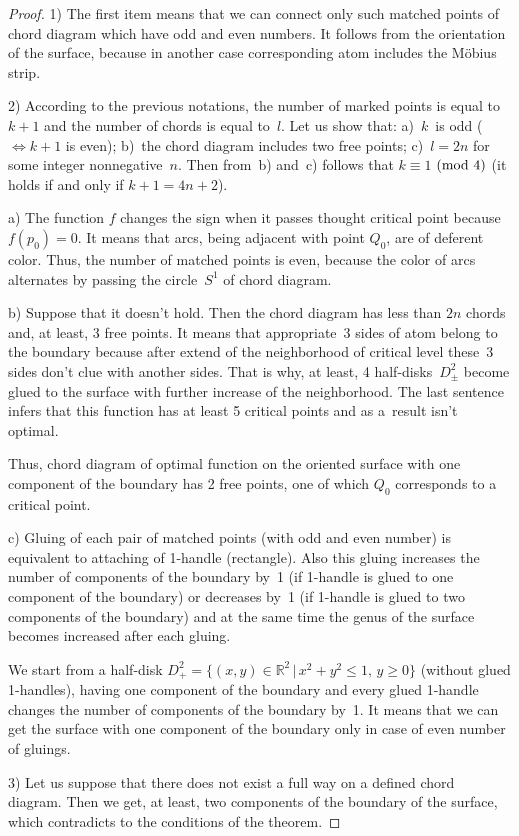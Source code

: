 \documentclass[pdftex]{sigma}
\numberwithin{equation}{section}
\begin{document}
\begin{proof}
1) The f\/irst item means that we can connect only such matched points of chord diagram which have odd and even numbers. It follows from the orientation of the surface, because in another case corresponding atom includes the M\"{o}bius strip.

2) According to the previous notations, the number of marked points is equal to $k+1$ and the number of chords is equal to~$l$. Let us show that: a)~$k$~is odd ($\Leftrightarrow k+1$ is even); b)~the chord diagram includes two free points; c)~$l=2n$ for some integer nonnegative~$n$. Then from~b) and~c) follows that $k\equiv1$ $({\rm mod}~4)$ (it holds if and only if $k+1=4n+2$).

a) The function $f$ changes the sign when it passes thought critical point because $f(p_{0})=0$. It means that arcs, being adjacent with point $Q_0$, are of deferent color. Thus, the number of matched points is even, because the color of arcs alternates by passing the circle~$S^1$ of chord diagram.

b) Suppose that it doesn't hold. Then the chord diagram has less than $2n$ chords and, at least, 3 free points. It means that appropriate~3 sides of atom belong to the boundary because after extend of the neighborhood of critical level these~3 sides don't clue with another sides. That is why, at least, 4 half-disks~$D^{2}_{\pm}$ become glued to the surface with further increase of the neighborhood. The last sentence infers that this function has at least 5 critical points and as a~result isn't optimal.

Thus, chord diagram of optimal function on the oriented surface with one component of the boundary has 2 free points, one of which $Q_{0}$ corresponds to a critical point.

c) Gluing of each pair of matched points (with odd and even number) is equivalent to attaching of 1-handle (rectangle). Also this gluing increases the number of components of the boundary by~1 (if 1-handle is glued to one component of the boundary) or decreases by~1 (if 1-handle is glued to two components of the boundary) and at the same time the genus of the surface becomes increased after each gluing.

We start from a half-disk $D^{2}_{+}=\{(x,y)\in\mathbb{R}^{2}\,|\, x^{2}+y^{2}\leq1,\, y\geq0\}$ (without glued 1-handles), having one component of the boundary and every glued 1-handle changes the number of components of the boundary by~1. It means that we can get the surface with one component of the boundary only in case of even number of gluings.

3) Let us suppose that there does not exist a full way on a def\/ined chord diagram. Then we get, at least, two components of the boundary of the surface, which contradicts to the conditions of the theorem.
\end{proof}
\end{document}
